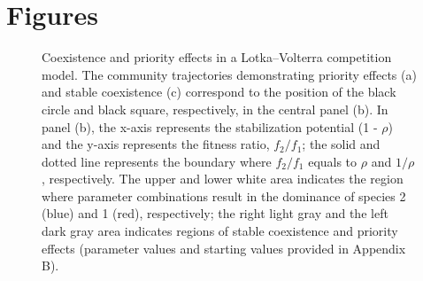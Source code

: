 \section{Figures}
\begin{figure}[h!]
	\centering
	\caption[Coexistence and priority effects in a Lotka--Volterra competition model.]
		{\hspace{1mm}Coexistence and priority effects in a Lotka--Volterra competition model. The community trajectories demonstrating priority effects (a) and stable coexistence (c) correspond to the position of the black circle and black square, respectively, in the central panel (b). In panel (b), the x-axis represents the stabilization potential (1 - $\rho$) and the y-axis represents the fitness ratio, $f_{2}/f_{1}$; the solid and dotted line represents the boundary where $f_{2}/f_{1}$ equals to $\rho$ and $1/\rho$, respectively. The upper and lower white area indicates the region where parameter combinations result in the dominance of species 2 (blue) and 1 (red), respectively; the right light gray and the left dark gray area indicates regions of stable coexistence and priority effects (parameter values and starting values provided in Appendix B).}
	\label{fig:FigBox}
\end{figure}



